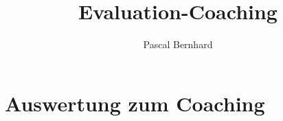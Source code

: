 \documentclass[11pt,a4paper]{scrreprt}
\author{Pascal Bernhard}
\title{Evaluation-Coaching}
\begin{document}
\chapter*{Auswertung zum Coaching}
\end{document}
